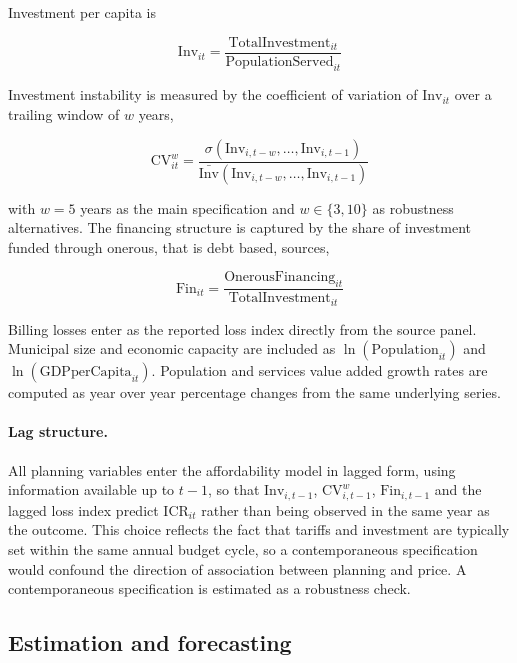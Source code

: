 \documentclass[pdflatex,sn-mathphys-num]{sn-jnl}%
\theoremstyle{thmstyleone}%
\theoremstyle{thmstyletwo}%
\theoremstyle{thmstylethree}%
\begin{document}
Investment per capita is

\begin{equation}
\text{Inv}_{it} = \frac{\text{TotalInvestment}_{it}}{\text{PopulationServed}_{it}}
\label{eq_inv}
\end{equation}

Investment instability is measured by the coefficient of variation of $\text{Inv}_{it}$ over a trailing window of $w$ years,

\begin{equation}
\text{CV}^{w}_{it} = \frac{\sigma\left(\text{Inv}_{i,t-w},\ldots,\text{Inv}_{i,t-1}\right)}{\bar{\text{Inv}}\left(\text{Inv}_{i,t-w},\ldots,\text{Inv}_{i,t-1}\right)}
\label{eq_cv}
\end{equation}

with $w=5$ years as the main specification and $w \in \{3,10\}$ as robustness alternatives. The financing structure is captured by the share of investment funded through onerous, that is debt based, sources,

\begin{equation}
\text{Fin}_{it} = \frac{\text{OnerousFinancing}_{it}}{\text{TotalInvestment}_{it}}
\label{eq_fin}
\end{equation}

Billing losses enter as the reported loss index directly from the source panel. Municipal size and economic capacity are included as $\ln(\text{Population}_{it})$ and $\ln(\text{GDPperCapita}_{it})$. Population and services value added growth rates are computed as year over year percentage changes from the same underlying series.

\paragraph{Lag structure.}

All planning variables enter the affordability model in lagged form, using information available up to $t-1$, so that $\text{Inv}_{i,t-1}$, $\text{CV}^{w}_{i,t-1}$, $\text{Fin}_{i,t-1}$ and the lagged loss index predict $\text{ICR}_{it}$ rather than being observed in the same year as the outcome. This choice reflects the fact that tariffs and investment are typically set within the same annual budget cycle, so a contemporaneous specification would confound the direction of association between planning and price. A contemporaneous specification is estimated as a robustness check.

\subsection{Estimation and forecasting}\label{subsec_panel_spec}
\end{document}
